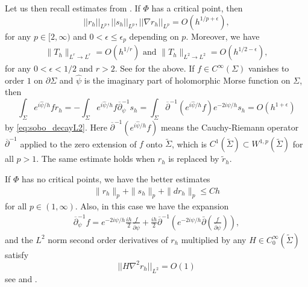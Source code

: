 \documentclass[a4paper, 10pt, twoside, notitlepage]{amsart}
\theoremstyle{plain}
\numberwithin{equation}{section}
\newcommand {\p} {\partial}
\newcommand{\eps}{\epsilon}
\newcommand{\norm}[1]{\lVert #1 \rVert}
\newcommand{\op}{\overline \p}
\begin{document}
Let us then recall estimates from \cite{guillarmou2011identification, guillarmou2011calderon, carstea2024calderonproblemriemanniansurfaces,liimatainen2023calder}. If $\Phi$ has a critical point, then  
\begin{equation}\label{eq:CZ_rh_norms}
||r_h||_{L^p}, ||s_h||_{L^p},   ||\nabla r_h||_{L^p}=O(h^{1/p+\epsilon}),
\end{equation}
for any $p\in[2,\infty)$ and $0<\eps\leq \epsilon_p$ depending on $p$. Moreover, we have
\begin{eqnarray}
\label{Th norm estimate}
 \norm{T_h}_{L^r\to L^r}=O(h^{1/r}) \text{ and } \norm{T_h}_{L^2\to L^2}=O(h^{1/2-\eps}), 
\end{eqnarray}
for any $0<\eps<1/2$ and $r>2$. 
See  \cite[Section 4.1]{carstea2024calderonproblemriemanniansurfaces} for the above. If
 $f\in C^\infty(\Sigma)$ vanishes to order $1$ on $\p \Sigma$ and $\hat \psi $ is the imaginary part of holomorphic Morse function on $\Sigma$, then 
\begin{equation}\label{eq_integrate_by_parts_doo}
  \int_\Sigma e^{i\hat \psi/h}f r_h=-\int_\Sigma e^{i\hat \psi/h}f \overline{\p}_\psi^{-1}s_h=\int_\Sigma  \op^{-1}(e^{i\hat \psi/h}f)e^{-2i\psi/h} s_h=O(h^{1+\eps})
 \end{equation} 
 by \eqref{eq:sobo_decayL2}. 
 Here $\op^{-1}(e^{i\hat \psi/h}f)$ means the Cauchy-Riemann operator $\op^{-1}$ applied to the zero extension of $f$ onto $\widetilde \Sigma$, which is $C^1(\widetilde\Sigma)\subset W^{1,p}(\widetilde\Sigma)$ for all $p>1$. The same estimate holds when $r_h$ is replaced by $\tilde r_h$. 



If $\Phi$ has no critical points, we have the better estimates
\begin{eqnarray}
\label{eq: no critical point estimate}
\|r_h\|_p +\|s_h\|_p+ \|d r_h\|_p \leq Ch
\end{eqnarray}
for all $p\in (1,\infty)$. Also, in this case we have the expansion
\begin{eqnarray}\label{eq: no critical point expansion II} \op_\psi^{-1} f =e^{-2i\psi/h} \frac{ih}{2} \frac{f}{\bar\partial\psi} + \frac{ih}{2}\op^{-1}\left( e^{-2i\psi/h}\bar\partial\left(\frac{f}{\bar\partial\psi}\right)\right),
\end{eqnarray} 
and the $L^2$ norm second order derivatives of $r_h$ multiplied by any $H\in C_0^{\infty}(\widetilde \Sigma)$ satisfy
\begin{equation}\label{eq_cald_zygm}
||H\nabla^2  r_{h}||_{L^2} =O(1)
\end{equation}
see \cite[Section 4.1]{carstea2024calderonproblemriemanniansurfaces} and \cite[Eq. (3.14)]{liimatainen2023calder}. 
\end{document}
